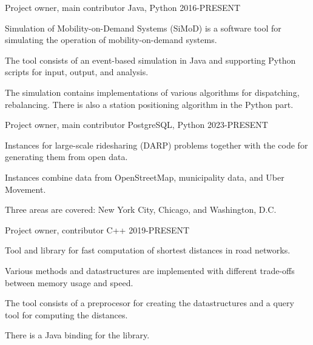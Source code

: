 

\begin{cventries}

  \cventry
    {Project owner, main contributor} %
    {} %
    {Java, Python} %
    {2016-PRESENT} %
    {
      \begin{cvitems} %
        \item {Simulation of Mobility-on-Demand Systems (SiMoD) is a software tool for simulating the operation of mobility-on-demand systems.}
        \item {The tool consists of an event-based simulation in Java and supporting Python scripts for input, output, and analysis.}
        \item {The simulation contains implementations of various algorithms for dispatching, rebalancing. There is also a station positioning algorithm in the Python part.}
      \end{cvitems}
    }

\cventry
{Project owner, main contributor} %
{} %
{PostgreSQL, Python} %
{2023-PRESENT} %
{
  \begin{cvitems} %
    \item {Instances for large-scale ridesharing (DARP) problems together with the code for generating them from open data.}
    \item {Instances combine data from OpenStreetMap, municipality data, and Uber Movement.}
    \item {Three areas are covered: New York City, Chicago, and Washington, D.C.}
  \end{cvitems}
}    

\cventry
{Project owner, contributor} %
{} %
{C++} %
{2019-PRESENT} %
{
  \begin{cvitems} %
    \item {Tool and library for fast computation of shortest distances in road networks.}
    \item {Various methods and datastructures are implemented with different trade-offs between memory usage and speed.}
    \item {The tool consists of a preprocesor for creating the datastructures and a query tool for computing the distances.}
    \item {There is a Java binding for the library.}
  \end{cvitems}
}   


\end{cventries}

